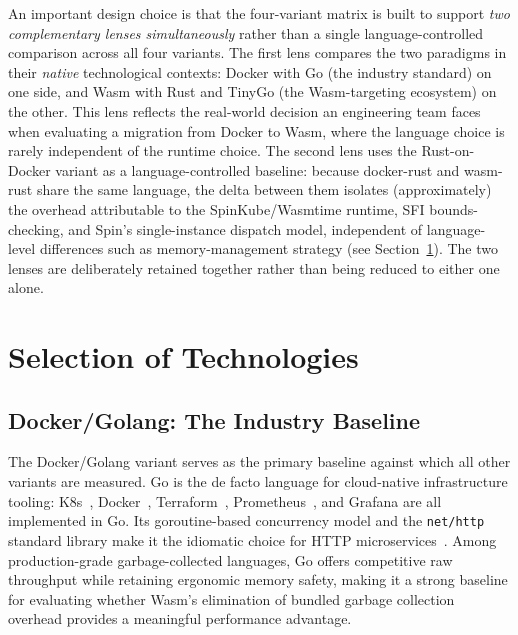 An important design choice is that the four-variant matrix is built to support \textit{two complementary lenses simultaneously} rather than a single language-controlled comparison across all four variants. The first lens compares the two paradigms in their \textit{native} technological contexts: Docker with Go (the industry standard) on one side, and \acs{Wasm} with Rust and TinyGo (the \acs{Wasm}-targeting ecosystem) on the other. This lens reflects the real-world decision an engineering team faces when evaluating a migration from Docker to \acs{Wasm}, where the language choice is rarely independent of the runtime choice. The second lens uses the Rust-on-Docker variant as a language-controlled baseline: because docker-rust and wasm-rust share the same language, the delta between them isolates (approximately) the overhead attributable to the SpinKube/Wasmtime runtime, \acs{SFI} bounds-checking, and Spin's single-instance dispatch model, independent of language-level differences such as memory-management strategy (see Section~\ref{sec:tech_selection}). The two lenses are deliberately retained together rather than being reduced to either one alone.

\section{Selection of Technologies}
\label{sec:tech_selection}

\subsection{Docker/Golang: The Industry Baseline}

\begin{sloppypar}
The Docker/Golang variant serves as the primary baseline against which all other variants are measured. Go is the de facto language for cloud-native infrastructure tooling: \acs{K8s}~\cite{burns2016borg, k8s2024architecture}, Docker~\cite{merkel2014docker, docker2024whatcontainer}, Terraform~\cite{terraform2024hashicorp}, Prometheus~\cite{prometheus2024cncf}, and Grafana are all implemented in Go. Its goroutine-based concurrency model and the \texttt{net/http} standard library make it the idiomatic choice for \acs{HTTP} microservices~\cite{go2024effective}. Among production-grade garbage-collected languages, Go offers competitive raw throughput while retaining ergonomic memory safety, making it a strong baseline for evaluating whether \acs{Wasm}'s elimination of bundled garbage collection overhead provides a meaningful performance advantage.
\end{sloppypar}

